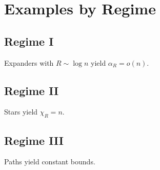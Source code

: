 \section{Examples by Regime}

\subsection*{Regime I}
Expanders with $R\sim\log n$ yield $\alpha_R=o(n)$.

\subsection*{Regime II}
Stars yield $\chi_R=n$.

\subsection*{Regime III}
Paths yield constant bounds.
